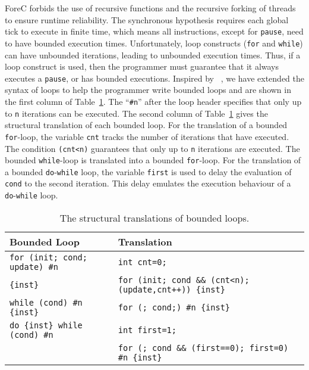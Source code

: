 ForeC forbids the use of recursive functions and the recursive 
forking of threads to ensure runtime reliability. 
The synchronous hypothesis requires each global tick to execute 
in finite time, which means all instructions, except for \verb$pause$, 
need to have bounded execution times. Unfortunately, loop constructs 
(\verb$for$ and \verb$while$) can have unbounded iterations, leading to
unbounded execution times. Thus, if a loop construct is used, 
then the programmer must guarantee that it always executes 
a \verb$pause$, or has bounded executions. Inspired by \pretc{}~\cite{pret_pretc}, 
we have extended the syntax of loops to help the programmer write 
bounded loops and are shown in the first column of Table~\ref{table:forec_loop_translations}. 
The ``\verb$#n$'' after the loop header specifies 
that only up to \verb$n$ iterations can be executed.
The second column of Table~\ref{table:forec_loop_translations}
gives the structural translation of each bounded loop. 
For the translation of a bounded \verb$for$-loop,
the variable \verb$cnt$ tracks the number of iterations that have 
executed. The condition \verb$(cnt<n)$ guarantees that 
only up to \verb$n$ iterations are executed. The bounded 
\verb$while$-loop is translated into a bounded \verb$for$-loop. 
For the translation of a bounded \verb$do$-\verb$while$ loop, 
the variable \verb$first$ is used to delay the evaluation of 
\verb$cond$ to the second iteration. This delay emulates the 
execution behaviour of a \verb$do$-\verb$while$ loop. 

\begin{table}
	\centering
	\renewcommand{\arraystretch}{1.25}
	
	\begin{tabular}{| l | l |}
		\hline
		\bf{Bounded Loop}							& \bf{Translation}											\\ \hline
		\verb$for (init; cond; update) #n$			& \verb$int cnt=0;$											\\
		\verb${inst}$								& \verb$for (init; cond && (cnt<n); (update,cnt++)) {inst}$	\\ \hline
		\verb$while (cond) #n {inst}$				& \verb$for (; cond;) #n {inst}$							\\ \hline
		\verb$do {inst} while (cond) #n$			& \verb$int first=1;$										\\
													& \verb$for (; cond && (first==0); first=0) #n {inst}$		\\ \hline
	\end{tabular}
	
	\caption{The structural translations of bounded loops.}
	\label{table:forec_loop_translations}
\end{table}
